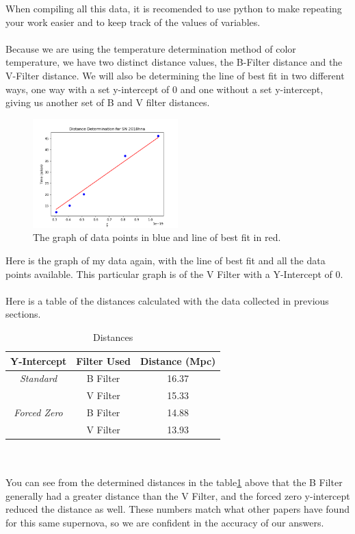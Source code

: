 When compiling all this data, it is recomended to use python to make repeating your work easier and 
to keep track of the values of variables. 
\\
\\
Because we are using the temperature determination method of color temperature, we have two distinct 
distance values, the B-Filter distance and the V-Filter distance. We will also be determining the line 
of best fit in two different ways, one way with a set y-intercept of 0 and one without a set y-intercept,
giving us another set of B and V filter distances.
\begin{figure} [h!]
    \begin{center}
    \includegraphics[width=0.5\textwidth]{Distance_Graph.png}
    \end{center}
    \label{fig:distance_graph}
    \caption{The graph of data points in blue and line of best fit in red.}    
\end{figure}
Here is the graph of my data again, with the line of best fit and all the data points available. 
This particular graph is of the V Filter with a Y-Intercept of 0.
\\
\\
Here is a table of the distances calculated with the data collected in previous sections.
\begin{table}[htbp]
    \caption{Distances}
    \label{tab:distances}
    \centering
    \begin{tabular}{|c|c|c|}\hline
    Y-Intercept & Filter Used & Distance (Mpc)\\\hline
    \textit{Standard} & B Filter & 16.37\\
    \textit{} & V Filter & 15.33\\\hline
    \textit{Forced Zero} & B Filter & 14.88\\
    \textit{} & V Filter & 13.93\\\hline
    \end{tabular}
\end{table}
\\
\\
You can see from the determined distances in the table\ref{tab:distances} above that the B Filter generally had a greater distance than the V Filter,
and the forced zero y-intercept reduced the distance as well. These numbers match what other papers have found for this same supernova, 
so we are confident in the accuracy of our answers.
